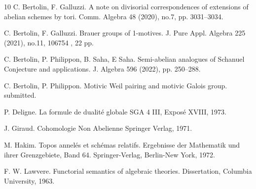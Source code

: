 \documentclass[11pt]{amsart}
\theoremstyle{definition}
\numberwithin{equation}{section}
\begin{document}
\begin{thebibliography}{10}
C. Bertolin, F. Galluzzi.
\newblock  A note on divisorial correspondences of  extensions of abelian schemes by tori.
\newblock Comm. Algebra 48 (2020), no.7, pp. 3031--3034.


C. Bertolin, F. Galluzzi.
\newblock Brauer groups of 1-motives.                                           											 	    
\newblock J. Pure Appl. Algebra 225 (2021), no.11, 106754 , 22 pp.  

C. Bertolin, P. Philippon,  B. Saha, E Saha.
\newblock Semi-abelian analogues of Schanuel Conjecture and applications.
\newblock J. Algebra 596 (2022), pp. 250--288.          


C. Bertolin, P. Philippon.
\newblock Motivic Weil pairing and motivic Galois group.
\newblock submitted.






 P. Deligne.
\newblock La formule de dualité globale
\newblock SGA 4 III, Exposé XVIII, 1973.


 J. Giraud.
\newblock Cohomologie Non Abelienne
\newblock Springer Verlag, 1971.

M. Hakim.
\newblock Topos annel\'es et sch\'emas relatifs.
\newblock Ergebnisse der Mathematik und ihrer Grenzgebiete, Band 64. Springer-Verlag, Berlin-New York, 1972.


 F. W. Lawvere.
\newblock Functorial semantics of algebraic theories.
\newblock Dissertation, Columbia University, 1963.




\end{thebibliography}
\end{document}
